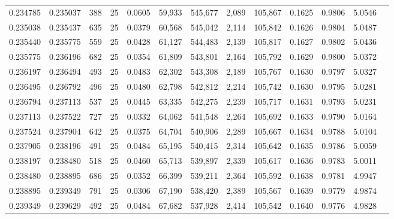 \begin{tabular}{rrrrrrrrrrrrr}
0.234785 & 0.235037 &   388 &  25 &                                     0.0605 &  59,933 & 545,677 &   2,089 & 105,867 & 0.1625 & 0.9806 & 5.0546 \\
0.235038 & 0.235437 &   635 &  25 &                                     0.0379 &  60,568 & 545,042 &   2,114 & 105,842 & 0.1626 & 0.9804 & 5.0487 \\
0.235440 & 0.235775 &   559 &  25 &                                     0.0428 &  61,127 & 544,483 &   2,139 & 105,817 & 0.1627 & 0.9802 & 5.0436 \\
0.235775 & 0.236196 &   682 &  25 &                                     0.0354 &  61,809 & 543,801 &   2,164 & 105,792 & 0.1629 & 0.9800 & 5.0372 \\
0.236197 & 0.236494 &   493 &  25 &                                     0.0483 &  62,302 & 543,308 &   2,189 & 105,767 & 0.1630 & 0.9797 & 5.0327 \\
0.236495 & 0.236792 &   496 &  25 &                                     0.0480 &  62,798 & 542,812 &   2,214 & 105,742 & 0.1630 & 0.9795 & 5.0281 \\
0.236794 & 0.237113 &   537 &  25 &                                     0.0445 &  63,335 & 542,275 &   2,239 & 105,717 & 0.1631 & 0.9793 & 5.0231 \\
0.237113 & 0.237522 &   727 &  25 &                                     0.0332 &  64,062 & 541,548 &   2,264 & 105,692 & 0.1633 & 0.9790 & 5.0164 \\
0.237524 & 0.237904 &   642 &  25 &                                     0.0375 &  64,704 & 540,906 &   2,289 & 105,667 & 0.1634 & 0.9788 & 5.0104 \\
0.237905 & 0.238196 &   491 &  25 &                                     0.0484 &  65,195 & 540,415 &   2,314 & 105,642 & 0.1635 & 0.9786 & 5.0059 \\
0.238197 & 0.238480 &   518 &  25 &                                     0.0460 &  65,713 & 539,897 &   2,339 & 105,617 & 0.1636 & 0.9783 & 5.0011 \\
0.238480 & 0.238895 &   686 &  25 &                                     0.0352 &  66,399 & 539,211 &   2,364 & 105,592 & 0.1638 & 0.9781 & 4.9947 \\
0.238895 & 0.239349 &   791 &  25 &                                     0.0306 &  67,190 & 538,420 &   2,389 & 105,567 & 0.1639 & 0.9779 & 4.9874 \\
0.239349 & 0.239629 &   492 &  25 &                                     0.0484 &  67,682 & 537,928 &   2,414 & 105,542 & 0.1640 & 0.9776 & 4.9828 \\

\end{tabular}
